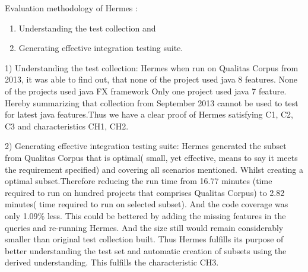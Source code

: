 \documentclass[authoryear,preprint]{sigplanconf}
\begin{document}
\begin{table*}[htbp]
	\centering
	\captionsetup{justification=centering}
	\caption{Characteristics available within each approach}
\label{tbl1}
\end{table*}

Evaluation methodology of Hermes : 
\begin{enumerate}
	\item Understanding the test collection and 
	\item Generating effective integration testing suite.
\end{enumerate}

1) Understanding the test collection:
Hermes when run on Qualitas Corpus from 2013, it was able to find out, that none of the project used java 8 features. None of the projects used java FX framework Only one project used java 7 feature. Hereby summarizing that collection from September 2013 cannot be used to test for latest java features.Thus we have a clear proof of Hermes satisfying C1, C2, C3 and characteristics CH1, CH2.

2) Generating effective integration testing suite:
Hermes generated the subset from Qualitas Corpus that is optimal( small, yet effective, means to say it meets the requirement specified) and covering all scenarios mentioned. Whilst creating a optimal subset.Therefore reducing the run time from 16.77 minutes (time required to run on hundred projects that comprises Qualitas Corpus) to 2.82 minutes( time required to run on selected subset). And the code coverage was only 1.09\% less. This could be bettered by adding the missing features in the queries and re-running Hermes. And the size still would remain considerably smaller than original test collection built. Thus Hermes fulfills its purpose of better understanding the test set and automatic creation of subsets using the derived understanding. This fulfills the characteristic CH3.
\end{document}
